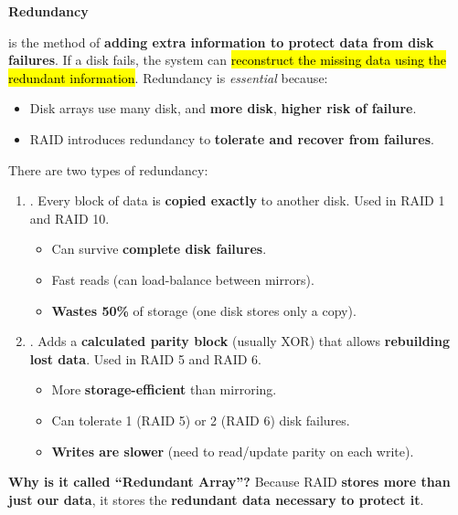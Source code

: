 \begin{flushleft}
    \textcolor{Green3}{ \textbf{Redundancy}}
\end{flushleft}
 is the method of \textbf{adding extra information to protect data from disk failures}. If a disk fails, the system can \hl{reconstruct the missing data using the redundant information}. Redundancy is \emph{essential} because:
\begin{itemize}
    \item Disk arrays use many disk, and \textbf{more disk}, \textbf{higher risk of failure}.
    \item RAID introduces redundancy to \textbf{tolerate and recover from failures}.
\end{itemize}
There are two types of redundancy:
\begin{enumerate}
    \item {}. Every block of data is \textbf{copied exactly} to another disk. Used in RAID 1 and RAID 10.
    \begin{itemize}
        \item[\textcolor{Green3}{\faIcon{check}}] Can survive \textbf{complete disk failures}.
        \item[\textcolor{Green3}{\faIcon{check}}] Fast reads (can load-balance between mirrors).
        \item[\textcolor{Red2}{\faIcon{times}}] \textbf{Wastes 50\%} of storage (one disk stores only a copy).
    \end{itemize}
    
    \item {}. Adds a \textbf{calculated parity block} (usually XOR) that allows \textbf{rebuilding lost data}. Used in RAID 5 and RAID 6.
    \begin{itemize}
        \item[\textcolor{Green3}{\faIcon{check}}] More \textbf{storage-efficient} than mirroring.
        \item[\textcolor{Green3}{\faIcon{check}}] Can tolerate 1 (RAID 5) or 2 (RAID 6) disk failures.
        \item[\textcolor{Red2}{\faIcon{times}}] \textbf{Writes are slower} (need to read/update parity on each write).
    \end{itemize}
\end{enumerate}
\textcolor{Green3}{ \textbf{Why is it called ``Redundant Array''?}} Because RAID \textbf{stores more than just our data}, it stores the \textbf{redundant data necessary to protect it}.


